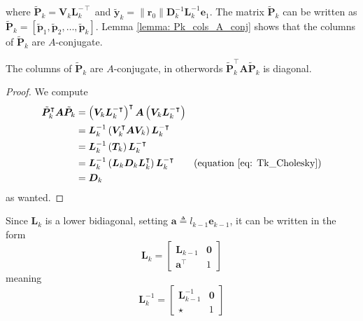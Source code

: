 where $\tilde{\bm{P}}_k = \bm{V}_{k} \bm{L}_k^{-\intercal}$ and $\tilde{\bm{y}}_k = \| \bm{r}_0 \| \bm{D}_k^{-1} \bm{L}_k^{-1} \bm{e}_1$. The matrix $\tilde{\bm{P}}_k$ can be written as
$\tilde{\bm{P}}_k = \left[ \tilde{\bm{p}}_1 , \tilde{\bm{p}}_2 , \ldots , \tilde{\bm{p}}_k \right]$. Lemma \ref{lemma: Pk_cols_A_conj} shows that the columns of $\tilde{\bm{P}}_k$ are $A$-conjugate.

\begin{lem} \label{lemma: Pk_cols_A_conj}
    The columns of $\tilde{\bm{P}}_k$ are $A$-conjugate, in otherwords $\tilde{\bm{P}}_k^{\intercal} \bm{A} \tilde{\bm{P}}_k$ is diagonal.
\end{lem}

\begin{proof}
    We compute
    \begin{align*}
        \tilde{\bm{P}}_k^{\intercal} \bm{A} \tilde{\bm{P}}_k
         & = \left( \bm{V}_{k} \bm{L}_k^{-\intercal} \right)^{\intercal} \bm{A} \left( \bm{V}_{k} \bm{L}_k^{-\intercal} \right)             \\
         & = \bm{L}_k^{-1} \left( \bm{V}_{k}^{\intercal} \bm{A} \bm{V}_{k} \right) \bm{L}_k^{-\intercal}                                    \\
         & = \bm{L}_k^{-1} \left( \bm{T}_k \right) \bm{L}_k^{-\intercal}                                                                    \\
         & = \bm{L}_k^{-1} \left( \bm{L}_k \bm{D}_k \bm{L}_k^{\intercal} \right) \bm{L}_k^{-\intercal} \tag{equation \ref{eq: Tk_Cholesky}} \\
         & = \bm{D}_k
    \end{align*}
    as wanted.
\end{proof}

Since $\bm{L}_k$ is a lower bidiagonal, setting $\bm{a} \triangleq l_{k-1} \bm{e}_{k-1}$, it can be written in the form
\[
    \bm{L}_k =
    \begin{bmatrix}
        \bm{L}_{k-1}       & \bm{0} \\
        \bm{a}^{\intercal} & 1
    \end{bmatrix}
\]
meaning
\[
    \bm{L}_k^{-1} =
    \begin{bmatrix}
        \bm{L}_{k-1}^{-1} & \bm{0} \\
        \star             & 1
    \end{bmatrix}
\]

